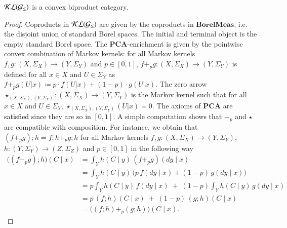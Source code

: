 \begin{proposition}
    \label{prop: SubStoch is convex biproduct}
    $\mathcal{KL}({\mathcal{G}_{\le}})$ is a convex biproduct category.
\end{proposition}
\begin{proof}
Coproducts in $\mathcal{KL}({\mathcal{G}_{\le}})$ are given by the coproducts in $\mathbf{BorelMeas}$, i.e. the disjoint union of standard Borel spaces. The initial and terminal object is the empty standard Borel space. The $\mathbf{PCA}$-enrichment is given by the pointwise convex combination of Markov kernels: for all Markov kernels $f,g\colon (X,\Sigma_X)\to (Y,\Sigma_Y)$ and $p\in [0,1]$, $f +_p g\colon (X,\Sigma_X)\to (Y,\Sigma_Y)$ is defined  for all $x\in X$ and $U\in \Sigma_Y$ as  $f+_p g(U|x)\coloneqq p\cdot f(U|x)+(1-p)\cdot g(U|x)$. The zero arrow $\star_{(X,\Sigma_X),(Y,\Sigma_Y)}\colon (X,\Sigma_X)\to (Y,\Sigma_Y)$ is the Markov kernel such that for all $x\in X$ and $U\in \Sigma_Y$, $\star_{(X,\Sigma_X),(Y,\Sigma_Y)}(U|x)=0$. The axioms of $\mathbf{PCA}$ are satisfied since they are so in $[0,1]$. A simple computation shows that $+_p$ and $\star$ are compatible with composition. For instance, %
 we obtain that $(f+_p g);h=f;h +_p g;h$ for all Markov kernels $f,g\colon (X,\Sigma_X)\to (Y,\Sigma_Y)$, $h\colon (Y,\Sigma_Y)\to (Z,\Sigma_Z)$ and $p\in [0,1]$ in the following way
\begin{align}
\big((f+_{p}g);h\big)(C\mid x)
&= \int_{Y} h(C\mid y)\,(f+_{p}g)(dy\mid x)
\tag*{} \\
&= \int_{Y} h(C\mid y)\,\big(p\,f(dy\mid x)+(1-p)\,g(dy\mid x)\big)
\tag*{} \\
&= p\int_{Y} h(C\mid y)\,f(dy\mid x) \;+\; (1-p)\int_{Y} h(C\mid y)\,g(dy\mid x)
\tag{linearity of the integral}\\
&= p\,(f;h)(C\mid x) \;+\; (1-p)\,(g;h)(C\mid x)
\tag*{} \\
&= \big((f;h)+_{p}(g;h)\big)(C\mid x).
\tag*{}
\end{align}







\end{proof}
